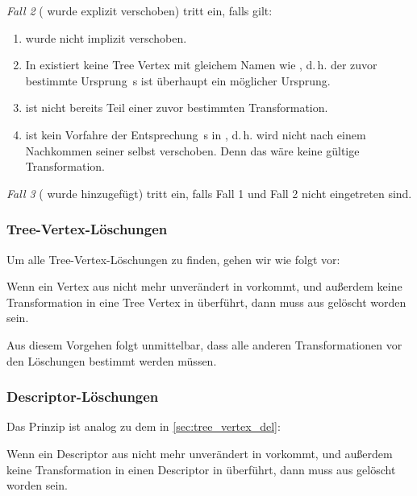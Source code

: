 \begin{itemize}
\textit{Fall 2} ( wurde explizit verschoben) tritt ein, falls gilt:
\begin{enumerate}
  \item {} wurde nicht implizit verschoben.
  \item In  existiert keine Tree Vertex mit gleichem Namen wie , d.\,h. der zuvor bestimmte Ursprung \,s ist überhaupt ein möglicher Ursprung.
  \item {} ist nicht bereits Teil einer zuvor bestimmten Transformation.  
  \item {} ist kein Vorfahre der Entsprechung \,s in , d.\,h.  wird nicht nach einem Nachkommen seiner selbst verschoben. Denn das wäre keine gültige Transformation.   
\end{enumerate}

\textit{Fall 3} ( wurde hinzugefügt) tritt ein, falls Fall 1 und Fall 2 nicht eingetreten sind. 

\end{itemize}

\subsubsection{Tree-Vertex-Löschungen}
\label{sec:tree_vertex_del}
Um alle Tree-Vertex-Löschungen zu finden, gehen wir wie folgt vor: \par
Wenn ein Vertex  aus  nicht mehr unverändert in  vorkommt, und außerdem keine Transformation  in eine Tree Vertex in  überführt, dann muss  aus  gelöscht worden sein. \par
Aus diesem Vorgehen folgt unmittelbar, dass alle anderen Transformationen vor den Löschungen bestimmt werden müssen.

\subsubsection{Descriptor-Löschungen}
Das Prinzip ist analog zu dem in \autoref{sec:tree_vertex_del}: \par
Wenn ein Descriptor  aus  nicht mehr unverändert in  vorkommt, und außerdem keine Transformation  in einen Descriptor in  überführt, dann muss  aus  gelöscht worden sein.

